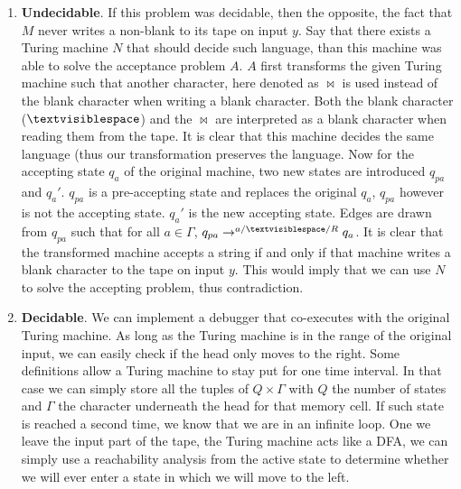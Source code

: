 \documentclass{article}
\begin{document}
\begin{exercise}
\begin{answer}
\begin{enumerate}
 \item \textbf{Undecidable}. If this problem was decidable, then the opposite, the fact that $M$ never writes a non-blank to its tape on input $y$. Say that there exists a Turing machine $N$ that should decide such language, than this machine was able to solve the acceptance problem $A$. $A$ first transforms the given Turing machine such that another character, here denoted as $\bowtie$ is used instead of the blank character when writing a blank character. Both the blank character ($\textvisiblespace$) and the $\bowtie$ are interpreted as a blank character when reading them from the tape. It is clear that this machine decides the same language (thus our transformation preserves the language. Now for the accepting state $q_a$ of the original machine, two new states are introduced $q_{pa}$ and $q_a'$. $q_{pa}$ is a pre-accepting state and replaces the original $q_a$, $q_{pa}$ however is not the accepting state. $q_a'$ is the new accepting state. Edges are drawn from $q_{pa}$ such that for all $a\in\Gamma$, $q_{pa}\rightarrow^{a/\textvisiblespace/R}q_a$. It is clear that the transformed machine accepts a string if and only if that machine writes a blank character to the tape on input $y$. This would imply that we can use $N$ to solve the accepting problem, thus contradiction.
 \item \textbf{Decidable}. We can implement a debugger that co-executes with the original Turing machine. As long as the Turing machine is in the range of the original input, we can easily check if the head only moves to the right. Some definitions allow a Turing machine to stay put for one time interval. In that case we can simply store all the tuples of $Q\times\Gamma$ with $Q$ the number of states and $\Gamma$ the character underneath the head for that memory cell. If such state is reached a second time, we know that we are in an infinite loop. One we leave the input part of the tape, the Turing machine acts like a DFA, we can simply use a reachability analysis from the active state to determine whether we will ever enter a state in which we will move to the left.
\end{enumerate}
\end{answer}
\end{exercise}
\end{document}
